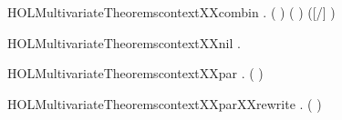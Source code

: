 \newcommand{\HOLMultivariateTheoremscontextXXbackwardXXrules}{\UseVerbatim{HOLMultivariateTheoremscontextXXbackwardXXrules}}
\begin{SaveVerbatim}{HOLMultivariateTheoremscontextXXcombin}
\HOLTokenTurnstile{} \HOLSymConst{\HOLTokenForall{}}  .
         \HOLSymConst{\HOLTokenConj{}}    \HOLSymConst{\HOLTokenConj{}}  ( )  \HOLSymConst{\HOLTokenConj{}}
       (  \HOLSymConst{=}  ) \HOLSymConst{\HOLTokenImp{}}
         ([/] )
\end{SaveVerbatim}
\newcommand{\HOLMultivariateTheoremscontextXXcombin}{\UseVerbatim{HOLMultivariateTheoremscontextXXcombin}}
\begin{SaveVerbatim}{HOLMultivariateTheoremscontextXXnil}
\HOLTokenTurnstile{} \HOLSymConst{\HOLTokenForall{}}.   
\end{SaveVerbatim}
\newcommand{\HOLMultivariateTheoremscontextXXnil}{\UseVerbatim{HOLMultivariateTheoremscontextXXnil}}
\begin{SaveVerbatim}{HOLMultivariateTheoremscontextXXpar}
\HOLTokenTurnstile{} \HOLSymConst{\HOLTokenForall{}}  .
         ( \HOLSymConst{\ensuremath{\parallel}} ) \HOLSymConst{\HOLTokenImp{}}    \HOLSymConst{\HOLTokenConj{}}   
\end{SaveVerbatim}
\newcommand{\HOLMultivariateTheoremscontextXXpar}{\UseVerbatim{HOLMultivariateTheoremscontextXXpar}}
\begin{SaveVerbatim}{HOLMultivariateTheoremscontextXXparXXrewrite}
\HOLTokenTurnstile{} \HOLSymConst{\HOLTokenForall{}}  .
         ( \HOLSymConst{\ensuremath{\parallel}} ) \HOLSymConst{\HOLTokenEquiv{}}    \HOLSymConst{\HOLTokenConj{}}   
\end{SaveVerbatim}
